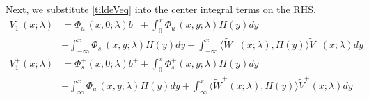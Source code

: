 \documentclass[thesis.tex]{subfiles}
\begin{document}
\begin{enumerate}
Next, we substitute \eqref{tildeVeq} into the center integral terms on the RHS.
\begin{equation*}
\begin{aligned}
V_1^-(x; \lambda) &= \Phi_u^-(x, 0; \lambda) b^- 
+ \int_0^x \Phi_u^-(x, y; \lambda) H(y) dy \\
&+ \int_{-\infty}^x \Phi_s^-(x, y; \lambda) H(y) dy + \int_{-\infty}^x \langle \tilde{W}^-(x; \lambda), H(y) \rangle \tilde{V}^-(x; \lambda) dy \\ 
V_1^+(x; \lambda) &= \Phi_s^+(x, 0; \lambda) b^+ 
+ \int_0^x \Phi_s^+(x, y; \lambda)H(y) dy \\
&+ \int_{\infty}^x \Phi_u^+(x, y; \lambda)H(y) dy + \int_{\infty}^x \langle \tilde{W}^+(x; \lambda), H(y) \rangle \tilde{V}^+(x; \lambda) dy
\end{aligned}
\end{equation*}

\end{enumerate}
\end{document}
